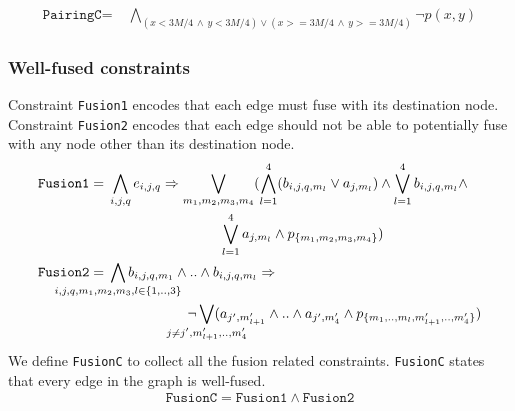 \begin{align*}
 \texttt{PairingC} =\;& \bigwedge\limits_{(x < 3M/4 \, \land  \, y < 3M/4) \lor  (x >= 3M/4 \, \land \, y >= 3M/4)} \neg p(x,y)
\end{align*}

\subsubsection{Well-fused constraints}
Constraint \texttt{Fusion1} encodes that each edge must fuse with
its destination node.
%
Constraint \texttt{Fusion2} encodes that each edge should not
be able to potentially fuse with any node other than its destination node.
\begin{align*}
\texttt{Fusion1} =\;&
\bigwedge\limits_{i,j,q} e_{i,j,q} \limplies
\bigvee_{{m_1,m_2,m_3,m_4}} (\Land_{l=1}^4 ( b_{i,j,q,m_l} \lor a_{j,m_l} ) \land 
\Lor\limits_{l=1}^4 b_{i,j,q,m_l} \land\\
& \qquad \qquad \qquad \qquad \Lor\limits_{l=1}^4 a_{j,m_l}\land p_{\{m_1,m_2,m_3,m_4\}})
\\
\texttt{Fusion2} =\;&
\bigwedge\limits_{\mathclap{i,j,q,m_1,m_2,m_3, l \in \{1,..,3\}}} b_{i,j,q,m_1} \land ..\land b_{i,j,q,m_l} \limplies \\
& \hspace{2cm} \neg 
\bigvee_{\mathclap{j \neq j^{\prime}, m_{l+1}^{\prime},..,m_{4}^{\prime}}} ( a_{j^{\prime},m_{l+1}^{\prime}} \land .. \land a_{j^{\prime},m_4^{\prime}} \land p_{\{m_1,..,m_l,m^{\prime}_{l+1},..,m^{\prime}_4\}})
\\
\end{align*}
We define \texttt{FusionC} to collect all the fusion related constraints.
% 
\texttt{FusionC} states that every edge in the graph is well-fused.
\begin{align*}
\texttt{FusionC} = \texttt{Fusion1} \land \texttt{Fusion2} 
\end{align*}

